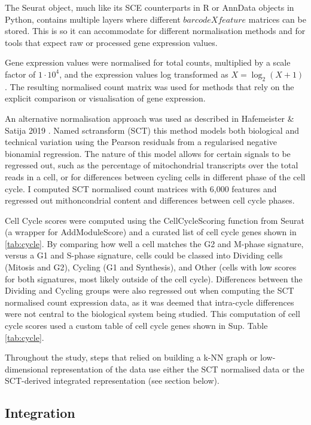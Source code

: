 The Seurat object, much like its SCE counterparts in R or AnnData objects in Python, contains multiple layers where different \(barcode X feature\) matrices can be stored. This is so it can accommodate for different normalisation methods and for tools that expect raw or processed gene expression values. 

Gene expression values were normalised for total counts, multiplied by a scale factor of  \(1\cdot10^4\), and the expression values log transformed as \(X = \log_2 (X+1)\). The resulting normalised count matrix was used for methods that rely on the explicit comparison or visualisation of gene expression.

An alternative normalisation approach was used as described in Hafemeister \& Satija 2019 \cite{hafemeister_normalization_2019}. Named sctransform (SCT) this method models both biological and technical variation using the Pearson residuals from a regularised negative bionamial regression. The nature of this model allows for certain signals to be regressed out, such as the percentage of mitochondrial transcripts over the total reads in a cell, or for differences between cycling cells in different phase of the cell cycle. I computed SCT normalised count matrices with 6,000 features and regressed out mithoncondrial content and differences between cell cycle phases.

Cell Cycle scores were computed using the CellCycleScoring function from Seurat (a wrapper for AddModuleScore) and a curated list of cell cycle genes shown in \ref{tab:cycle}. By comparing how well a cell matches the G2 and M-phase signature, versus a G1 and S-phase signature, cells could be classed into Dividing cells (Mitosis and G2), Cycling (G1 and Synthesis), and Other (cells with low scores for both signatures, most likely outside of the cell cycle). Differences between the Dividing and Cycling groups were also regressed out when computing the SCT normalised count expression data, as it was deemed that intra-cycle differences were not central to the biological system being studied. This computation of cell cycle scores used a custom table of cell cycle genes shown in Sup. Table \ref{tab:cycle}.

Throughout the study, steps that relied on building a k-NN graph or low-dimensional representation of the data use either the SCT normalised data or the SCT-derived integrated representation (see section below).

\subsection{Integration}

